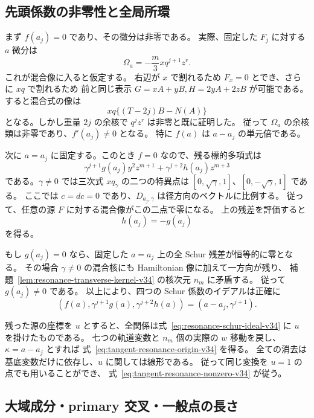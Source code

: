 \subsection{先頭係数の非零性と全局所環}

まず $f(a_j)=0$ であり、その微分は非零である。
実際、固定した $F_j$ に対する $a$ 微分は
\[
 \Omega_a=-\frac m3xq^{j+1}z^r.
\]
これが混合像に入ると仮定する。
右辺が $x$ で割れるため $F_x=0$ とでき、さらに $xq$ で割れるため
前と同じ表示 $G=xA+yB,H=2yA+2zB$ が可能である。
すると混合式の像は
\[
 xq\{(T-2j)B-N(A)\}
\]
となる。しかし重量 $2j$ の余核で $q^jz^r$ は非零と既に証明した。
従って $\Omega_a$ の余核類は非零であり、$f'(a_j)\ne0$ となる。
特に $f(a)$ は $a-a_j$ の単元倍である。

次に $a=a_j$ に固定する。このとき $f=0$ なので、残る標的多項式は
\[
 \gamma^{j+1}g(a_j)y^2z^{m+1}
 +\gamma^{j+2}h(a_j)z^{m+3}
\]
である。$\gamma\ne0$ では三次式 $xq_\gamma$ の二つの特異点は
$[0,\sqrt\gamma,1]$、$[0,-\sqrt\gamma,1]$ である。
ここでは $c=dc=0$ であり、$D_{a_j,\gamma}$ は径方向のベクトルに比例する。
従って、任意の源 $F$ に対する混合像がこの二点で零になる。
上の残差を評価すると
\[
 h(a_j)=-g(a_j)
\]
を得る。

もし $g(a_j)=0$ なら、固定した $a=a_j$ 上の全 Schur 残差が恒等的に零となる。
その場合 $\gamma\ne0$ の混合核にも Hamiltonian 像に加えて一方向が残り、
補題~\ref{lem:resonance-transverse-kernel-v34} の核次元 $n_m$ に矛盾する。
従って $g(a_j)\ne0$ である。
以上により、四つの Schur 係数のイデアルは正確に
\begin{equation}
 (f(a),\gamma^{j+1}g(a),\gamma^{j+2}h(a))
 =(a-a_j,\gamma^{j+1}).
 \label{eq:resonance-schur-ideal-v34}
\end{equation}

残った源の座標を $u$ とすると、全関係は式~\eqref{eq:resonance-schur-ideal-v34} に $u$ を掛けたものである。
七つの軌道変数と $n_m$ 個の実際の $w$ 移動を戻し、$\kappa=a-a_j$ とすれば
式~\eqref{eq:tangent-resonance-origin-v34} を得る。
全ての消去は基底変数だけに依存し、$u$ に関しては線形である。
従って同じ変換を $u=1$ の点でも用いることができ、
式~\eqref{eq:tangent-resonance-nonzero-v34} が従う。

\subsection{大域成分・primary 交叉・一般点の長さ}

